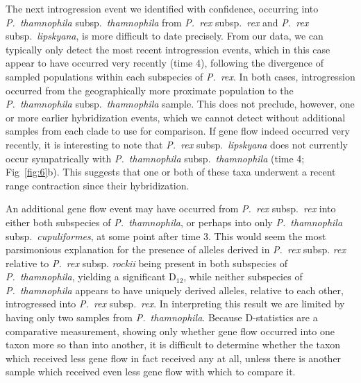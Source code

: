 \documentclass[12pt,letterpaper]{article}
\begin{document}
The next introgression event we identified with confidence,
occurring into \emph{P.~thamnophila} subsp.\ \emph{thamnophila} from 
\emph{P.~rex} subsp.\ \emph{rex} and \emph{P.~rex} subsp.\
\emph{lipskyana}, is more difficult to date precisely. From our data,
we can typically only detect the most recent introgression events, 
which in this case appear to have occurred very recently
(time 4), following the divergence of sampled populations within each
subspecies of \emph{P.~rex}. In both cases, introgression occurred
from the geographically more proximate population to the
\emph{P.~thamnophila} subsp.\ \emph{thamnophila} sample. This does not
preclude, however, one or more earlier hybridization events,
which we cannot detect without additional samples from 
each clade to use for comparison. If gene flow indeed occurred very
recently, it is interesting to note that \emph{P.~rex} subsp.\
\emph{lipskyana} does not currently occur sympatrically with
\emph{P.~thamnophila} subsp.\ \emph{thamnophila} (time 4;
Fig~\ref{fig:6}b). This suggests that one or both of these taxa
underwent a recent range contraction since their hybridization.

An additional gene flow event may have occurred from \emph{P.~rex}
subsp.\ \emph{rex} into either both subspecies of
\emph{P.~thamnophila}, or perhaps into only \emph{P.~thamnophila}
subsp.\ \emph{cupuliformes}, at some point after time 3. This would
seem the most parsimonious explanation for the presence of alleles
derived in \emph{P.~rex} subsp. \emph{rex} relative to \emph{P.~rex}
subsp. \emph{rockii} being present in both subspecies of
\emph{P.~thamnophila}, yielding a significant D$_{12}$,
while neither subspecies of \emph{P.~thamnophila} appears to have
uniquely derived alleles, relative to each other, introgressed into
\emph{P.~rex} subsp.\ \emph{rex}.  In interpreting this result we are
limited by having only two samples from \emph{P.~thamnophila}. Because
D-statistics are a comparative measurement, showing only whether gene
flow occurred into one taxon more so than into another, it is
difficult to determine whether the taxon which received less gene flow
in fact received any at all, unless there is another sample which
received even less gene flow with which to compare it.
\end{document}
